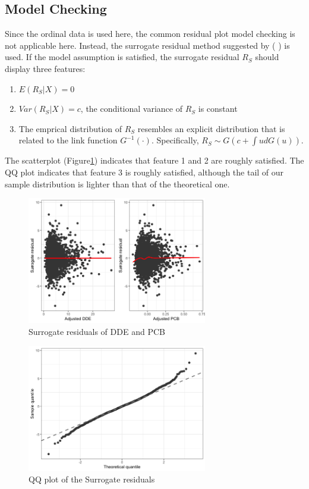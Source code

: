 \documentclass[wcp]{jmlr}%
\begin{document}
\subsection{Model Checking}
Since the ordinal data is used here, the common residual plot model checking is not applicable here. Instead, the surrogate residual method suggested by (%
) is used. If the model assumption is satisfied, the surrogate residual $R_S$ should display three features: 

\begin{enumerate}
	\item $E(R_S|X)=0$
	\item $Var(R_S|X)=c$, the conditional variance of $R_S$ is constant
	\item The emprical distribution of $R_S$ resembles an explicit distribution that is related to the link function $G^{-1}(\cdot)$. Specifically, $R_S\sim G(c+\int ud G(u))$.
\end{enumerate}

The scatterplot (Figure\ref{fig:surrogateresid}) indicates that feature 1 and 2 are roughly satisfied. The QQ plot indicates that feature 3 is roughly satisfied, although the tail of our sample distribution is lighter than that of the theoretical one. 

\begin{figure}
	\centering
	\includegraphics[width=0.7\textwidth]{Surrogate_residuals.png}
	\caption{Surrogate residuals of DDE and PCB}
	\label{fig:surrogateresid}
\end{figure}

\begin{figure}
	\centering
	\includegraphics[width=0.7\textwidth]{qqplot.png}
	\caption{QQ plot of the Surrogate residuals}
	\label{fig:qqplot}
\end{figure}
\end{document}
